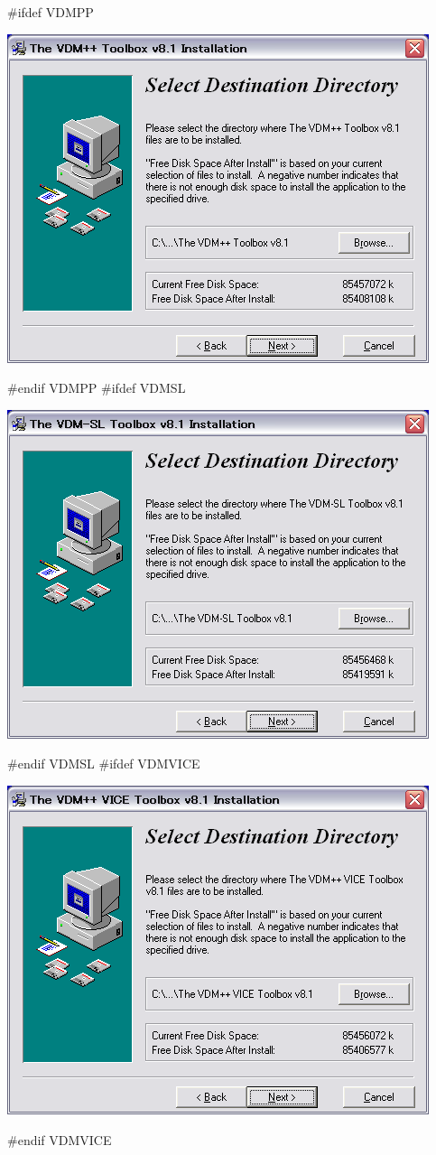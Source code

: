 \documentclass[\pformat,12pt]{jarticle}
\begin{document}
\begin{enumerate}
#ifdef VDMPP
\begin{center}
\includegraphics[scale=0.42,bb=0 0 467 364]{install_pp_second.png}
\end{center}
#endif VDMPP
#ifdef VDMSL
\begin{center}
\includegraphics[scale=0.42,bb=0 0 467 364]{install_sl_second.png}
\end{center}
#endif VDMSL
#ifdef VDMVICE
\begin{center}
\includegraphics[scale=0.42,bb=0 0 467 364]{install_vice_second.png}
\end{center}
#endif VDMVICE


\end{enumerate}
\end{document}
